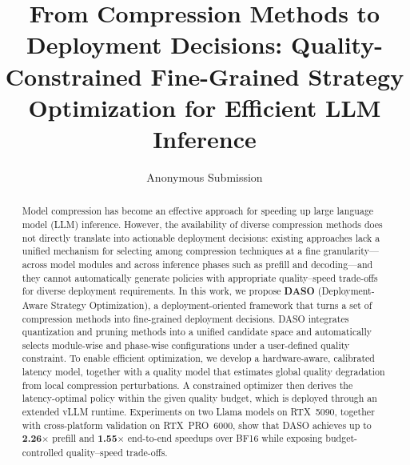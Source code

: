 \documentclass[letterpaper]{article} %
\title{From Compression Methods to Deployment Decisions: Quality-Constrained Fine-Grained Strategy Optimization for Efficient LLM Inference}
\author{Anonymous Submission}
\begin{document}
\maketitle

\begin{abstract}
Model compression has become an effective approach for speeding up large language model (LLM) inference. However, the availability of diverse compression methods does not directly translate into actionable deployment decisions: existing approaches lack a unified mechanism for selecting among compression techniques at a fine granularity---across model modules and across inference phases such as prefill and decoding---and they cannot automatically generate policies with appropriate quality--speed trade-offs for diverse deployment requirements. In this work, we propose \textbf{DASO} (Deployment-Aware Strategy Optimization), a deployment-oriented framework that turns a set of compression methods into fine-grained deployment decisions. DASO integrates quantization and pruning methods into a unified candidate space and automatically selects module-wise and phase-wise configurations under a user-defined quality constraint. To enable efficient optimization, we develop a hardware-aware, calibrated latency model, together with a quality model that estimates global quality degradation from local compression perturbations. A constrained optimizer then derives the latency-optimal policy within the given quality budget, which is deployed through an extended vLLM runtime. Experiments on two Llama models on RTX~5090, together with cross-platform validation on RTX~PRO~6000, show that DASO achieves up to \textbf{2.26$\times$} prefill and \textbf{1.55$\times$} end-to-end speedups over BF16 while exposing budget-controlled quality--speed trade-offs.
\end{abstract}



\end{document}
